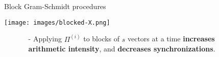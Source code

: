 \documentclass[t,usepdftitle=false]{beamer}
\begin{document}
\begin{frame}{Block Gram-Schmidt procedures}
\begin{minipage}[t]{.3\textwidth}\vspace{.2cm}
\begin{center}\hspace*{.4cm}\texttt{[image: images/blocked-X.png]}\end{center}
\end{minipage}\vspace{-.6cm}
\begin{itemize}
\item[] 
\begin{itemize}\normalsize
\item[-] Applying $\Pi^{(i)}$ to blocks of $s$ vectors at a time \textbf{increases}\\ 
\textbf{arithmetic intensity}, and \textbf{decreases synchronizations}.
\end{itemize}
\end{itemize}
\end{frame}
\end{document}
